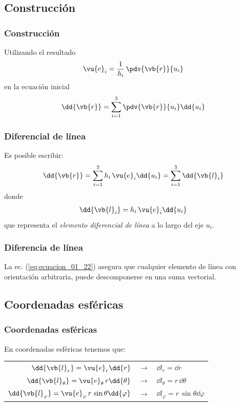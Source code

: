 \subsection{Construcción}
\begin{frame}
\frametitle{Construcción}
Utilizando el resultado
\begin{align*}
\vu{e}_{i} = \dfrac{1}{h_{i}} \, \pdv{\vb{r}}{u_{i}}
\end{align*}
en la ecuación inicial
\begin{align*}
\dd{\vb{r}} = \sum_{i=1}^{3} \pdv{\vb{r}}{u_{i}} \dd{u_{i}}
\end{align*}
\end{frame}
\begin{frame}
\frametitle{Diferencial de línea}
Es posible escribir:
\begin{align}
\dd{\vb{r}} = \sum_{i=1}^{3} h_{i} \, \vu{e}_{i} \dd{u_{i}} = \sum_{i=1}^{3} \dd{\vb{l}_{i}}
\label{eq:ecuacion_01_21}
\end{align}
\pause
donde
\begin{align}
\dd{\vb{l}_{i}} = h_{i} \, \vu{e}_{i} \dd{u_{i}}
\label{eq:ecuacion_01_22}
\end{align}
que representa el \emph{elemento diferencial de línea} a lo largo del eje $u_{i}$.
\end{frame}
\begin{frame}
\frametitle{Diferencia de línea}
La ec. (\ref{eq:ecuacion_01_22}) asegura que cualquier elemento de línea con orientación arbitraria, puede descomponerse en una suma vectorial.
\end{frame}
\subsection*{Coordenadas esféricas}
\begin{frame}
\frametitle{Coordenadas esféricas}
En coordenadas esféricas tenemos que:
\begin{table}
\begin{tabular}{r  c  l}
$\dd{\vb{l}_{r}} = \vu{e}_{r} \dd{r}$ & $\longrightarrow$ & $\dd{l_{r}} = \dd{r}$ \\
$\dd{\vb{l}_{\theta}} = \vu{e}_{\theta} \, r \dd{\theta}$ & $\longrightarrow$ & $\dd{l_{\theta}} = r \, \dd{\theta}$ \\
$\dd{\vb{l}_{\varphi}} = \vu{e}_{\varphi} \, r \, \sin \theta \dd{\varphi}$ & $\longrightarrow$ & $\dd{l_{\varphi}} = r \, \sin \theta \dd{\varphi}$ \\
\end{tabular}
\end{table}
\end{frame}
